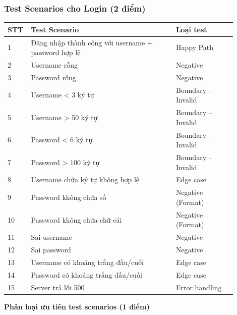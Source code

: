 \documentclass[a4paper,12pt]{article}
\begin{document}
\subsubsection{Test Scenarios cho Login (2 điểm)}
\begin{longtable}{|p{0.05\linewidth}|p{0.6\linewidth}|p{0.25\linewidth}|}
\hline
\textbf{STT} & \textbf{Test Scenario} & \textbf{Loại test} \\
\hline
1 & Đăng nhập thành công với username + password hợp lệ & Happy Path \\ \hline
2 & Username rỗng & Negative \\ \hline
3 & Password rỗng & Negative \\ \hline
4 & Username \textless{} 3 ký tự & Boundary -- Invalid \\ \hline
5 & Username \textgreater{} 50 ký tự & Boundary -- Invalid \\ \hline
6 & Password \textless{} 6 ký tự & Boundary -- Invalid \\ \hline
7 & Password \textgreater{} 100 ký tự & Boundary -- Invalid \\ \hline
8 & Username chứa ký tự không hợp lệ & Edge case \\ \hline
9 & Password không chứa số & Negative (Format) \\ \hline
10 & Password không chứa chữ cái & Negative (Format) \\ \hline
11 & Sai username & Negative \\ \hline
12 & Sai password & Negative \\ \hline
13 & Username có khoảng trắng đầu/cuối & Edge case \\ \hline
14 & Password có khoảng trắng đầu/cuối & Edge case \\ \hline
15 & Server trả lỗi 500 & Error handling \\ \hline
\end{longtable}
\textbf{Phân loại ưu tiên test scenarios (1 điểm)}
\end{document}

